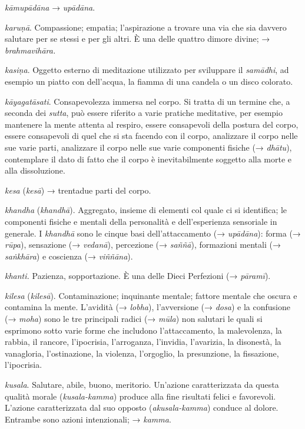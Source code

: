 \emph{kāmupādāna} → \emph{upādāna}.

\emph{karuṇā}. Compassione; empatia; l'aspirazione a trovare una via che
sia davvero salutare per se stessi e per gli altri. È una delle quattro
dimore divine; → \emph{brahmavihāra.}

\emph{kasiṇa}. Oggetto esterno di meditazione utilizzato per sviluppare
il \emph{samādhi}, ad esempio un piatto con dell'acqua, la fiamma di una
candela o un disco colorato.

\emph{kāyagatāsati}. Consapevolezza immersa nel corpo. Si tratta di un
termine che, a seconda dei \emph{sutta}, può essere riferito a varie
pratiche meditative, per esempio mantenere la mente attenta al respiro,
essere consapevoli della postura del corpo, essere consapevoli di quel
che si sta facendo con il corpo, analizzare il corpo nelle sue varie
parti, analizzare il corpo nelle sue varie componenti fisiche (→
\emph{dhātu}), contemplare il dato di fatto che il corpo è
inevitabilmente soggetto alla morte e alla dissoluzione.

\emph{kesa} (\emph{kesā}) → trentadue parti del corpo.

\emph{khandha} (\emph{khandhā}). Aggregato, insieme di elementi col
quale ci si identifica; le componenti fisiche e mentali della
personalità e dell'esperienza sensoriale in generale. I \emph{khandhā}
sono le cinque basi dell'attaccamento (→ \emph{upādāna}): forma (→
\emph{rūpa}), sensazione (→ \emph{vedanā}), percezione (→ \emph{saññā}),
formazioni mentali (→ \emph{saṅkhāra}) e coscienza (→ \emph{viññāna}).

\emph{khanti.} Pazienza, sopportazione. È una delle Dieci Perfezioni (→
\emph{pāramī}).

\emph{kilesa} (\emph{kilesā}). Contaminazione; inquinante mentale;
fattore mentale che oscura e contamina la mente. L'avidità (→
\emph{lobha}), l'avversione (→ \emph{dosa}) e la confusione (→
\emph{moha}) sono le tre principali radici (→ \emph{mūla}) non salutari
le quali si esprimono sotto varie forme che includono l'attaccamento, la
malevolenza, la rabbia, il rancore, l'ipocrisia, l'arroganza, l'invidia,
l'avarizia, la disonestà, la vanagloria, l'ostinazione, la violenza,
l'orgoglio, la presunzione, la fissazione, l'ipocrisia.

\emph{kusala}. Salutare, abile, buono, meritorio. Un'azione
caratterizzata da questa qualità morale (\emph{kusala-kamma}) produce
alla fine risultati felici e favorevoli. L'azione caratterizzata dal suo
opposto (\emph{akusala-kamma}) conduce al dolore. Entrambe sono azioni
intenzionali; → \emph{kamma}.

